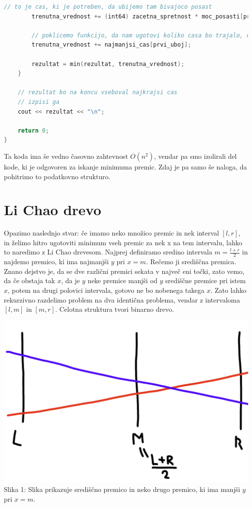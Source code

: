 \begin{lstlisting}[label={lst:code7}, language=C++]
        // to je cas, ki je potreben, da ubijemo tam bivajoco posast
        trenutna_vrednost += (int64) zacetna_spretnost * moc_posasti[prvi_uboj];

        // poklicemo funkcijo, da nam ugotovi koliko casa bo trajalo, da pridemo do konca
        trenutna_vrednost += najmanjsi_cas[prvi_uboj];

        rezultat = min(rezultat, trenutna_vrednost);
    }

    // rezultat bo na koncu vseboval najkrajsi cas
    // izpisi ga
    cout << rezultat << "\n";

    return 0;
}
\end{lstlisting}

Ta koda ima še vedno časovno zahtevnost $O(n^2)$, vendar pa smo izolirali del kode, ki je odgovoren za iskanje minimuma premic.
Zdaj je pa samo še naloga, da pohitrimo to podatkovno strukturo.

\section{Li Chao drevo}\label{sec:li-chao-drevo}
Opazimo naslednjo stvar: če imamo neko množico premic in nek interval $[l, r]$, in želimo hitro ugotoviti minimum vseh premic za nek x na tem intervalu, lahko to naredimo z Li Chao drevesom.
Najprej definiramo sredino intervala $m = \frac{l + r}{2}$ in najdemo premico, ki ima najmanjši $y$ pri $x = m$.
Rečemo ji središčna premica.
Znano dejstvo je, da se dve različni premici sekata v največ eni točki, zato vemo, da če obstaja tak $x$, da je $y$ neke premice manjši od $y$ središčne premice pri istem $x$, potem na drugi polovici intervala, gotovo ne bo nobenega takega $x$.
Zato lahko rekurzivno razdelimo problem na dva identična problema, vendar z intervaloma $[l, m]$ in $[m, r]$.
Celotna struktura tvori binarno drevo.

\includegraphics[scale=0.6]{image1}
Slika 1: Slika prikazuje središčno premico in neko drugo premico, ki ima manjši $y$ pri $x = m$.
\\
\\

